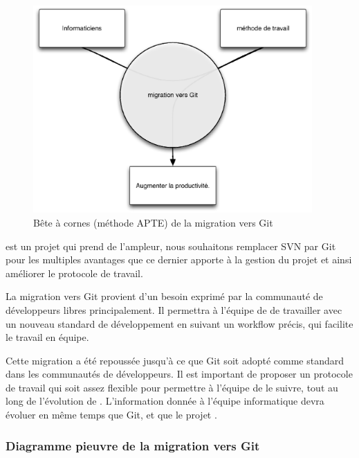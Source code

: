\begin{figure}[h]
\begin{center}
\leavevmode
\includegraphics[width=0.95\textwidth]{pictures/GitBAC}
\end{center}
\caption{Bête à cornes (méthode {APTE\textregistered}) de la migration vers Git}
\label{fig:BACGit}
\end{figure}

{\gofigure} est un projet qui prend de l'ampleur,
nous souhaitons remplacer SVN par Git pour les multiples avantages
que ce dernier apporte à la gestion du projet et ainsi améliorer le protocole de travail.

La migration vers Git provient d'un besoin exprimé par la communauté de développeurs libres principalement.
Il permettra à l'équipe de {\gofigure} de travailler 
avec un nouveau standard de développement en suivant un workflow précis, qui facilite le travail en équipe.

Cette migration a été repoussée jusqu'à ce que Git soit adopté comme standard dans les communautés de développeurs.
Il est important de proposer un protocole de travail qui soit assez flexible pour permettre à l'équipe de le suivre,
tout au long de l'évolution de {\gofigure}.
L'information donnée à l'équipe informatique devra évoluer en même temps que Git, et que le projet {\gofigure}.


\subsubsection*{Diagramme pieuvre de la migration vers Git}

